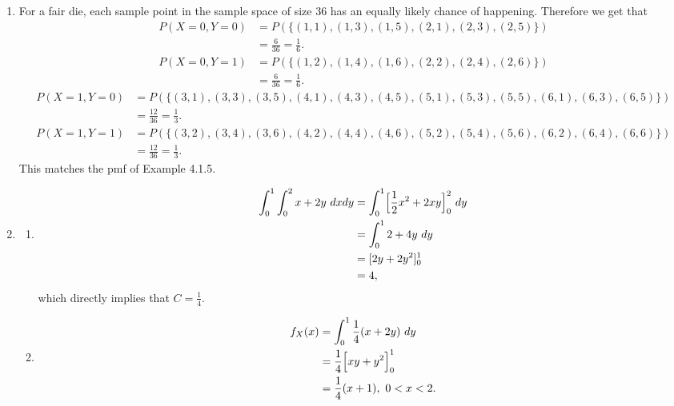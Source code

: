 \documentclass{article}
\begin{document}
\begin{enumerate}
    \item For a fair die, each sample point in the sample space of size 36 has an equally likely chance of 
    happening. Therefore we get that 
    \begin{align*}
        P(X = 0, Y = 0)
        &= P(\{
            (1, 1), (1, 3), (1, 5), (2, 1), (2, 3), (2, 5)
        \}) \\
        &= \frac{6}{36} = \frac{1}{6}.
    \end{align*}
    \begin{align*}
        P(X = 0, Y = 1) 
        &= P(\{
            (1, 2), (1, 4), (1, 6), (2, 2), (2, 4), (2, 6)
        \}) \\
        &= \frac{6}{36} = \frac{1}{6}.
    \end{align*}
    \begin{align*}
        P(X = 1, Y = 0) 
        &= P(\{
            (3, 1), (3, 3), (3, 5), (4, 1), (4, 3), (4, 5), (5, 1), (5, 3), (5, 5), (6, 1), (6, 3), (6, 5)
        \}) \\
        &= \frac{12}{36} = \frac{1}{3}.
    \end{align*}
    \begin{align*}
        P(X = 1, Y = 1) 
        &= P(\{
            (3, 2), (3, 4), (3, 6), (4, 2), (4, 4), (4, 6), (5, 2), (5, 4), (5, 6), (6, 2), (6, 4), (6, 6)
        \}) \\
        &= \frac{12}{36} = \frac{1}{3}.
    \end{align*}
    This matches the pmf of Example 4.1.5.

    \item \begin{enumerate}
        \item \begin{align*}
            \int_{0}^{1} \int_{0}^{2} x + 2y \ dxdy
            &= \int_{0}^{1} \Bigl[ \frac{1}{2}x^2 + 2xy \Bigr]_0^2 \ dy \\
            &= \int_{0}^{1} 2 + 4y \ dy \\
            &= [2y + 2y^2]_0^1 \\
            &= 4,
        \end{align*}
        which directly implies that $C = \frac{1}{4}$.

        \item \begin{align*}
            f_X(x)
            &= \int_{0}^{1} \frac{1}{4}(x + 2y) \ dy \\
            &= \frac{1}{4} \Bigl[ xy + y^2 \Bigr]_0^1 \\
            &= \frac{1}{4} (x + 1), \ 0 < x < 2.
        \end{align*}


\end{enumerate}
\end{enumerate}
\end{document}
